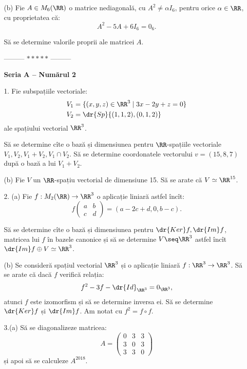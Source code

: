 (b) Fie $ A \in M_6(\RR) $ o matrice nediagonală, cu $ A^2 \neq \alpha I_6 $, pentru
orice $ \alpha \in \RR $, cu proprietatea că:
\[
  A^2 - 5 A + 6I_6 = 0_6.
\]

Să se determine valorile proprii ale matricei $ A $.

\vspace{0.5cm}
\begin{center}
  --------- $\ast\ast\ast\ast\ast$ ---------
\end{center}
\vspace{0.5cm}

\textbf{Seria A -- Numărul 2}

1. Fie subspațiile vectoriale:
\begin{align*}
  V_1 &= \{ (x, y, z) \in \RR^3 \mid 3x - 2y + z = 0 \} \\
  V_2 &= \dr{Sp}\{(1, 1, 2), (0, 1, 2) \}
\end{align*}
ale spațiului vectorial $ \RR^3 $.

Să se determine cîte o bază și dimensiunea pentru $ \RR $-spațiile vectoriale
$ V_1, V_2, V_1 + V_2, V_1 \cap V_2 $. Să se determine coordonatele
vectorului $ v = (15, 8, 7) $ după o bază a lui $ V_1 + V_2 $.

(b) Fie $ V $ un $ \RR $-spațiu vectorial de dimensiune 15. Să se arate
că $ V \simeq \RR^{15} $.

\vspace{0.5cm}

2. (a) Fie $ f : M_2(\RR) \to \RR^3 $ o aplicație liniară astfel încît:
\[
  f \begin{pmatrix} a & b \\ c & d \end{pmatrix} = (a - 2c + d, 0, b - c).
\]

Să se determine cîte o bază și dimensiunea pentru $ \dr{Ker} f, \dr{Im}f $,
matricea lui $ f $ în bazele canonice și să se determine $ V \seq \RR^3 $
astfel încît $ \dr{Im}f \oplus V \simeq \RR^3 $.

(b) Se consideră spațiul vectorial $ \RR^3 $ și o aplicație liniară
$ f : \RR^3 \to \RR^3 $. Să se arate că dacă $ f $ verifică relația:
\[
  f^2 - 3f - \dr{Id}_{\RR^3} = 0_{\RR^3},
\]
atunci $ f $ este izomorfism și să se determine inversa ei. Să se determine
$ \dr{Ker}f $ și $ \dr{Im}f $. Am notat cu $ f^2 = f \circ f $.

\vspace{0.5cm}

3.(a) Să se diagonalizeze matricea:
\[
  A = \begin{pmatrix}
    0 & 3 & 3 \\
    3 & 0 & 3 \\
    3 & 3 & 0
  \end{pmatrix}
\]
și apoi să se calculeze $ A^{2018} $.

